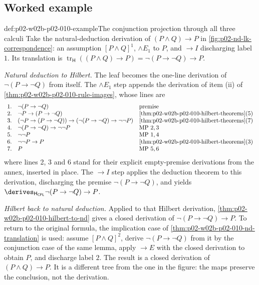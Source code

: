 \subsection{Worked example}
\label{sec:p02-w02b-p02-010-example}

\begin{hbexample}{def:p02-w02b-p02-010-example}{The conjunction projection through all three calculi}
Take the natural-deduction derivation of \((P\land Q)\to P\) in
\cref{fig:p02-nd-lk-correspondence}: an assumption \([P\land Q]^1\),
\(\land E_1\) to \(P\), and \(\to I\) discharging label \(1\).  Its
translation is
\(\operatorname{tr}_{\mathsf H}((P\land Q)\to P)=\neg(P\to\neg Q)\to P\).

\emph{Natural deduction to Hilbert.}  The leaf becomes the one-line
derivation of \(\neg(P\to\neg Q)\) from itself.  The \(\land E_1\) step
appends the derivation of item (ii) of
\cref{thm:p02-w02b-p02-010-rule-images}, whose lines are
\[
\begin{array}{rll}
1.&\neg(P\to\neg Q)&\text{premise}\\
2.&\neg P\to(P\to\neg Q)&\text{\cref{thm:p02-w02b-p02-010-hilbert-theorems}(5)}\\
3.&(\neg P\to(P\to\neg Q))\to(\neg(P\to\neg Q)\to\neg\neg P)&\text{\cref{thm:p02-w02b-p02-010-hilbert-theorems}(7)}\\
4.&\neg(P\to\neg Q)\to\neg\neg P&\text{MP }2,3\\
5.&\neg\neg P&\text{MP }1,4\\
6.&\neg\neg P\to P&\text{\cref{thm:p02-w02b-p02-010-hilbert-theorems}(3)}\\
7.&P&\text{MP }5,6
\end{array}
\]
where lines 2, 3 and 6 stand for their explicit empty-premise derivations
from the annex, inserted in place.  The \(\to I\) step applies the deduction
theorem to this derivation, discharging the premise
\(\neg(P\to\neg Q)\), and yields
\(\derives_{\mathsf H_{\mathsf{CPL}}}\neg(P\to\neg Q)\to P\).

\emph{Hilbert back to natural deduction.}  Applied to that Hilbert
derivation, \cref{thm:p02-w02b-p02-010-hilbert-to-nd} gives a closed
derivation of \(\neg(P\to\neg Q)\to P\).  To return to the original
formula, the implication case of
\cref{thm:p02-w02b-p02-010-nd-translation} is used: assume
\([P\land Q]^2\), derive \(\neg(P\to\neg Q)\) from it by the conjunction case
of the same lemma, apply \(\to E\) with the closed derivation to obtain
\(P\), and discharge label \(2\).  The result is a closed derivation of
\((P\land Q)\to P\).  It is a different tree from the one in the figure: the
maps preserve the conclusion, not the derivation.


\end{hbexample}
